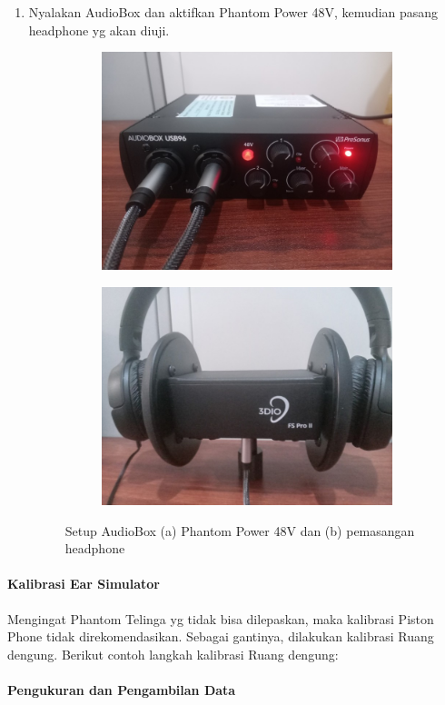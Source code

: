 \documentclass{article}
\begin{document}
\begin{enumerate}
		\item Nyalakan AudioBox dan aktifkan Phantom Power 48V, kemudian pasang headphone yg akan diuji.

		\begin{figure}[H]
			\centering
			\begin{subfigure}[]{.45\textwidth}
				\includegraphics[width=\textwidth]{images/fspro/setup4}
				\caption{}
			\end{subfigure}
			\begin{subfigure}[]{.45\textwidth}
				\includegraphics[width=\textwidth]{images/fspro/setup5}
				\caption{}
			\end{subfigure}
			\caption{Setup AudioBox (a) Phantom Power 48V dan (b) pemasangan headphone}
			\label{fig:Setup FS2Pro Selesai}
		\end{figure}

	\end{enumerate}

	\paragraph{Kalibrasi Ear Simulator}

	Mengingat Phantom Telinga yg tidak bisa dilepaskan, maka kalibrasi Piston Phone tidak direkomendasikan.
	Sebagai gantinya, dilakukan kalibrasi Ruang dengung.
	Berikut contoh langkah kalibrasi Ruang dengung:



	\paragraph{Pengukuran dan Pengambilan Data}
\end{document}
